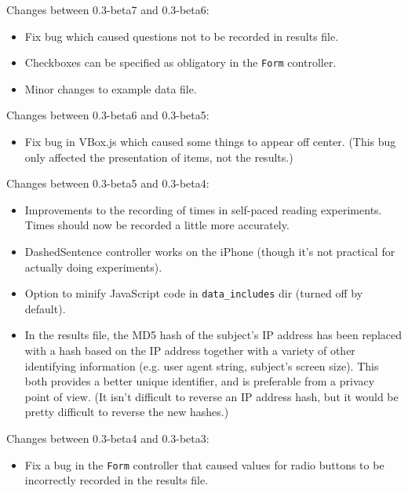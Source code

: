 \documentclass[
]{article}
\providecommand{\tightlist}{%
  \setlength{\itemsep}{0pt}\setlength{\parskip}{0pt}}
\begin{document}
Changes between 0.3-beta7 and 0.3-beta6:

\begin{itemize}
\tightlist
\item
  Fix bug which caused questions not to be recorded in results file.
\item
  Checkboxes can be specified as obligatory in the \texttt{Form}
  controller.
\item
  Minor changes to example data file.
\end{itemize}

Changes between 0.3-beta6 and 0.3-beta5:

\begin{itemize}
\tightlist
\item
  Fix bug in VBox.js which caused some things to appear off center.
  (This bug only affected the presentation of items, not the results.)
\end{itemize}

Changes between 0.3-beta5 and 0.3-beta4:

\begin{itemize}
\item
  Improvements to the recording of times in self-paced reading
  experiments. Times should now be recorded a little more accurately.
\item
  DashedSentence controller works on the iPhone (though it's not
  practical for actually doing experiments).
\item
  Option to minify JavaScript code in \texttt{data\_includes} dir
  (turned off by default).
\item
  In the results file, the MD5 hash of the subject's IP address has been
  replaced with a hash based on the IP address together with a variety
  of other identifying information (e.g. user agent string, subject's
  screen size). This both provides a better unique identifier, and is
  preferable from a privacy point of view. (It isn't difficult to
  reverse an IP address hash, but it would be pretty difficult to
  reverse the new hashes.)
\end{itemize}

Changes between 0.3-beta4 and 0.3-beta3:

\begin{itemize}
\tightlist
\item
  Fix a bug in the \texttt{Form} controller that caused values for radio
  buttons to be incorrectly recorded in the results file.
\end{itemize}
\end{document}
